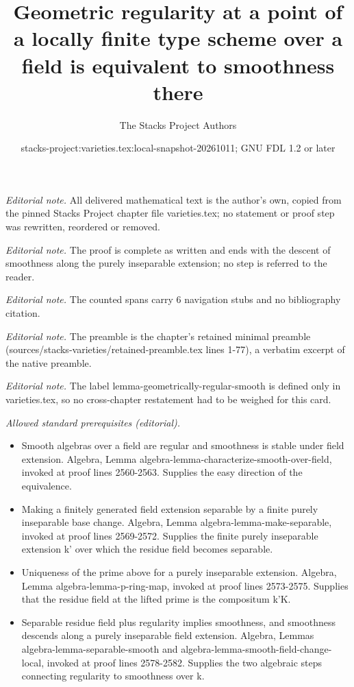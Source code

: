 \documentclass[10pt,a4paper]{amsart}
\title{Geometric regularity at a point of a locally finite type scheme over a field is equivalent to smoothness there}
\author{The Stacks Project Authors}
\date{stacks-project:varieties.tex:local-snapshot-20261011; GNU FDL 1.2 or later}
\theoremstyle{plain}
\theoremstyle{definition}
\theoremstyle{remark}
\numberwithin{equation}{subsection}
\begin{document}
\maketitle
\noindent\textit{Editorial note.} All delivered mathematical text is the author's own, copied from the pinned Stacks Project chapter file varieties.tex; no statement or proof step was rewritten, reordered or removed.\par\medskip
\noindent\textit{Editorial note.} The proof is complete as written and ends with the descent of smoothness along the purely inseparable extension; no step is referred to the reader.\par\medskip
\noindent\textit{Editorial note.} The counted spans carry 6 navigation stubs and no bibliography citation.\par\medskip
\noindent\textit{Editorial note.} The preamble is the chapter's retained minimal preamble (sources/stacks-varieties/retained-preamble.tex lines 1-77), a verbatim excerpt of the native preamble.\par\medskip
\noindent\textit{Editorial note.} The label lemma-geometrically-regular-smooth is defined only in varieties.tex, so no cross-chapter restatement had to be weighed for this card.\par\medskip
\noindent\textit{Allowed standard prerequisites (editorial).}\begin{itemize}
\item Smooth algebras over a field are regular and smoothness is stable under field extension. Algebra, Lemma algebra-lemma-characterize-smooth-over-field, invoked at proof lines 2560-2563. Supplies the easy direction of the equivalence.
\item Making a finitely generated field extension separable by a finite purely inseparable base change. Algebra, Lemma algebra-lemma-make-separable, invoked at proof lines 2569-2572. Supplies the finite purely inseparable extension k' over which the residue field becomes separable.
\item Uniqueness of the prime above for a purely inseparable extension. Algebra, Lemma algebra-lemma-p-ring-map, invoked at proof lines 2573-2575. Supplies that the residue field at the lifted prime is the compositum k'K.
\item Separable residue field plus regularity implies smoothness, and smoothness descends along a purely inseparable field extension. Algebra, Lemmas algebra-lemma-separable-smooth and algebra-lemma-smooth-field-change-local, invoked at proof lines 2578-2582. Supplies the two algebraic steps connecting regularity to smoothness over k.
\end{itemize}\medskip
\end{document}
